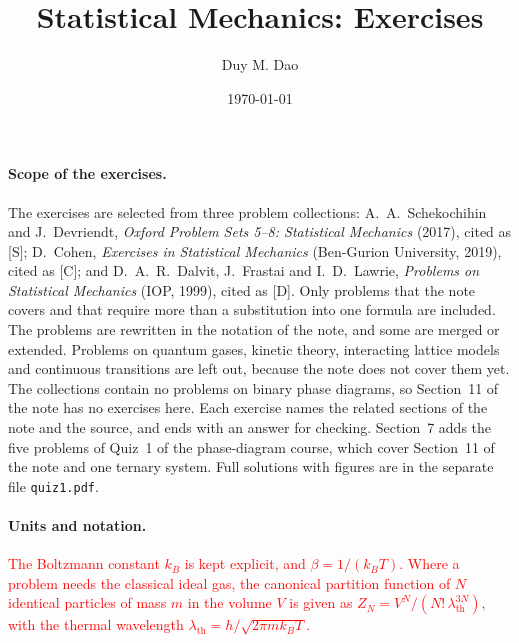 \documentclass[11pt]{article}      %
\title{Statistical Mechanics: Exercises}
\author{Duy M. Dao}
\date{\today}                      %
\numberwithin{equation}{section}   %
\begin{document}
\maketitle                         %

\newenvironment{parts}
  {\begin{enumerate}\renewcommand{\theenumi}{\alph{enumi}}\renewcommand{\labelenumi}{(\theenumi)}}
  {\end{enumerate}}

\paragraph{Scope of the exercises.}
The exercises are selected from three problem collections:
A.~A.~Schekochihin and J.~Devriendt, \textit{Oxford Problem Sets 5--8: Statistical Mechanics} (2017), cited as [S];
D.~Cohen, \textit{Exercises in Statistical Mechanics} (Ben-Gurion University, 2019), cited as [C];
and D.~A.~R.~Dalvit, J.~Frastai and I.~D.~Lawrie, \textit{Problems on Statistical Mechanics} (IOP, 1999), cited as [D].
Only problems that the note covers and that require more than a substitution into one formula are included.
The problems are rewritten in the notation of the note, and some are merged or extended.
Problems on quantum gases, kinetic theory, interacting lattice models and continuous transitions are left out, because the note does not cover them yet.
The collections contain no problems on binary phase diagrams, so Section~11 of the note has no exercises here.
Each exercise names the related sections of the note and the source, and ends with an answer for checking.
Section~7 adds the five problems of Quiz~1 of the phase-diagram course, which cover Section~11 of the note and one ternary system. Full solutions with figures are in the separate file \texttt{quiz1.pdf}.

\paragraph{Units and notation.}
\textcolor{red}{The Boltzmann constant $k_B$ is kept explicit, and $\beta = 1/(k_BT)$.
Where a problem needs the classical ideal gas, the canonical partition function of $N$ identical particles of mass $m$ in the volume $V$ is given as $Z_N = V^N/(N!\,\lambda_{\text{th}}^{3N})$, with the thermal wavelength $\lambda_{\text{th}} = h/\sqrt{2\pi m k_BT}$.}

\end{document}
